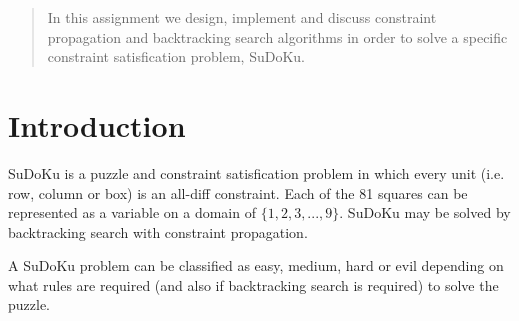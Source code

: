 \documentclass[12pt]{article}
\begin{document}
\maketitle

\begin{abstract}
In this assignment we design, implement and discuss constraint propagation and backtracking search algorithms in order to solve a specific constraint satisfication problem, SuDoKu. 
\end{abstract}

\section{Introduction}

SuDoKu is a puzzle and constraint satisfication problem in which every unit (i.e. row, column or box) is an all-diff constraint. Each of the 81 squares can be represented as a variable on a domain of $\{1, 2, 3, ..., 9\}$. SuDoKu may be solved by backtracking search with constraint propagation.

A SuDoKu problem can be classified as easy, medium, hard or evil depending on what rules are required (and also if backtracking search is required) to solve the puzzle.







\end{document}
